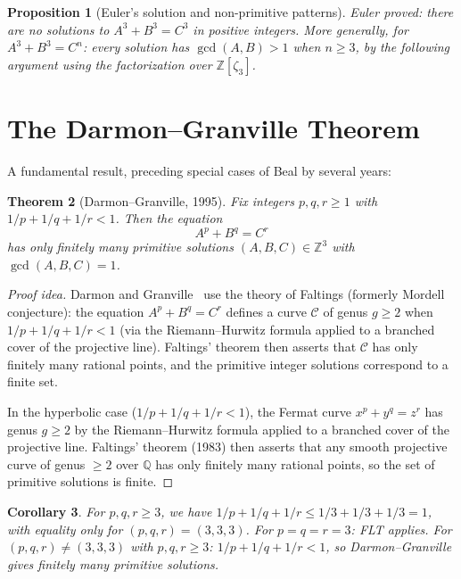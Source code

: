 \documentclass[12pt,a4paper]{amsart}
\newtheorem{theorem}{Theorem}[section]
\newtheorem{corollary}[theorem]{Corollary}
\newtheorem{proposition}[theorem]{Proposition}
\theoremstyle{definition}
\theoremstyle{remark}
\begin{document}
\begin{proposition}[Euler's solution and non-primitive patterns]
Euler proved: there are no solutions to $A^3 + B^3 = C^3$ in positive integers.
More generally, for $A^3 + B^3 = C^n$: every solution has $\gcd(A,B) > 1$ when
$n \geq 3$, by the following argument using the factorization over $\mathbb{Z}[\zeta_3]$.
\end{proposition}

\section{The Darmon--Granville Theorem}

A fundamental result, preceding special cases of Beal by several years:

\begin{theorem}[Darmon--Granville, 1995]\label{thm:DG}
Fix integers $p, q, r \geq 1$ with $1/p + 1/q + 1/r < 1$. Then the equation
\[
  A^p + B^q = C^r
\]
has only finitely many primitive solutions $(A, B, C) \in \mathbb{Z}^3$ with
$\gcd(A, B, C) = 1$.
\end{theorem}

\begin{proof}[Proof idea]
Darmon and Granville~\cite{DG95} use the theory of Faltings (formerly Mordell
conjecture): the equation $A^p + B^q = C^r$ defines a curve $\mathcal{C}$ of
genus $g \geq 2$ when $1/p + 1/q + 1/r < 1$ (via the Riemann--Hurwitz formula
applied to a branched cover of the projective line). Faltings' theorem then
asserts that $\mathcal{C}$ has only finitely many rational points, and the
primitive integer solutions correspond to a finite set.

In the hyperbolic case ($1/p + 1/q + 1/r < 1$), the Fermat curve
$x^p + y^q = z^r$ has genus $g \geq 2$ by the Riemann--Hurwitz formula applied
to a branched cover of the projective line. Faltings' theorem (1983) then
asserts that any smooth projective curve of genus $\geq 2$ over $\mathbb{Q}$ has
only finitely many rational points, so the set of primitive solutions is finite.
\end{proof}

\begin{corollary}
For $p, q, r \geq 3$, we have $1/p + 1/q + 1/r \leq 1/3 + 1/3 + 1/3 = 1$,
with equality only for $(p,q,r) = (3,3,3)$. For $p = q = r = 3$: FLT applies.
For $(p,q,r) \neq (3,3,3)$ with $p,q,r \geq 3$: $1/p+1/q+1/r < 1$, so
Darmon--Granville gives finitely many primitive solutions.
\end{corollary}
\end{document}
